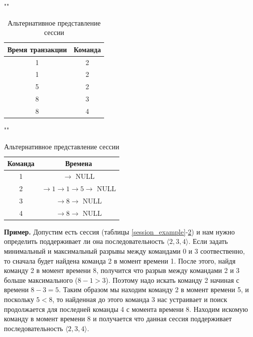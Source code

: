 \begin{table}[H]
	\begin{minipage}[h]{0.49\linewidth}
		\caption{Пример сессии}
		\label{session_example}
		""\newline
		\begin{tabular}{ | c | c | }
			\hline
			Время транзакции & Команда \\ \hline
			1 & 2 \\ \hline
			1 & 2 \\ \hline
			5 & 2 \\ \hline
			8 & 3 \\ \hline
			8 & 4 \\ \hline
		\end{tabular}
	\end{minipage}
	\begin{minipage}[h]{0.49\linewidth}
		\caption{Альтернативное представление сессии}
		\label{session_alternative_representation}
		""\newline
		\begin{tabular}{ | c | c | }
			\hline
			Команда & Времена \\ \hline
			1 & $\rightarrow$ NULL \\ \hline
			2 & $\rightarrow 1 \rightarrow 1 \rightarrow 5 \rightarrow$ NULL \\ \hline
			3 & $\rightarrow 8 \rightarrow$ NULL \\ \hline
			4 & $\rightarrow 8 \rightarrow$ NULL \\ \hline
		\end{tabular}
	\end{minipage}
\end{table}


\textbf{Пример.} Допустим есть сессия (таблицы \ref{session_example}-\ref{session_alternative_representation}) и нам нужно определить поддерживает ли она последовательность $\langle2,3,4\rangle$. Если задать минимальный и максимальный разрывы между командами 0 и 3 соотвественно, то сначала будет найдена команда 2 в момент времени 1. После этого, найдя команду 2 в момент времени 8, получится что разрыв между командами 2 и 3 больше максимального ($8-1>3$). Поэтому надо искать команду 2 начиная с времени $8-3=5$. Таким образом мы находим команду 2 в момент времени 5, и поскольку $5<8$, то найденная до этого команда 3 нас устраивает и поиск продолжается для последней команды 4 с момента времени 8. Находим искомую команду в момент времени 8 и получается что данная сессия поддерживает последовательность $\langle2,3,4\rangle$.

